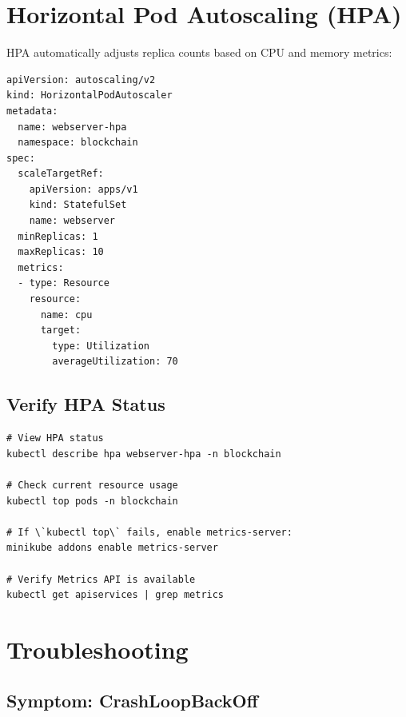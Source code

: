 \section{Horizontal Pod Autoscaling (HPA)}
\label{sec:k8s-autoscaling}

HPA automatically adjusts replica counts based on CPU and memory metrics:

\begin{listing}[htbp]
\caption{HPA Configuration}
\label{lst:ch23-hpa}
\begin{verbatim}
apiVersion: autoscaling/v2
kind: HorizontalPodAutoscaler
metadata:
  name: webserver-hpa
  namespace: blockchain
spec:
  scaleTargetRef:
    apiVersion: apps/v1
    kind: StatefulSet
    name: webserver
  minReplicas: 1
  maxReplicas: 10
  metrics:
  - type: Resource
    resource:
      name: cpu
      target:
        type: Utilization
        averageUtilization: 70
\end{verbatim}
\end{listing}

\subsection{Verify HPA Status}

\begin{listing}[H]
\caption{Check Autoscaling Status}
\label{lst:ch23-hpa-status}
\begin{verbatim}
# View HPA status
kubectl describe hpa webserver-hpa -n blockchain

# Check current resource usage
kubectl top pods -n blockchain

# If \`kubectl top\` fails, enable metrics-server:
minikube addons enable metrics-server

# Verify Metrics API is available
kubectl get apiservices | grep metrics
\end{verbatim}
\end{listing}

\section{Troubleshooting}
\label{sec:k8s-troubleshooting}

\subsection{Symptom: CrashLoopBackOff}

